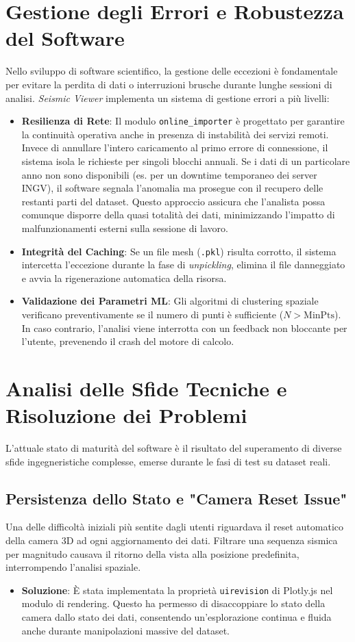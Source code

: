 \documentclass[12pt,a4paper]{article}
\begin{document}
\section{Gestione degli Errori e Robustezza del Software}
Nello sviluppo di software scientifico, la gestione delle eccezioni è fondamentale per evitare la perdita di dati o interruzioni brusche durante lunghe sessioni di analisi. \textit{Seismic Viewer} implementa un sistema di gestione errori a più livelli:
\begin{itemize}
    \item \textbf{Resilienza di Rete}: Il modulo \texttt{online\_importer} è progettato per garantire la continuità operativa anche in presenza di instabilità dei servizi remoti. Invece di annullare l'intero caricamento al primo errore di connessione, il sistema isola le richieste per singoli blocchi annuali. Se i dati di un particolare anno non sono disponibili (es. per un downtime temporaneo dei server INGV), il software segnala l'anomalia ma prosegue con il recupero delle restanti parti del dataset. Questo approccio assicura che l'analista possa comunque disporre della quasi totalità dei dati, minimizzando l'impatto di malfunzionamenti esterni sulla sessione di lavoro.
    \item \textbf{Integrità del Caching}: Se un file mesh (\texttt{.pkl}) risulta corrotto, il sistema intercetta l'eccezione durante la fase di \textit{unpickling}, elimina il file danneggiato e avvia la rigenerazione automatica della risorsa.
    \item \textbf{Validazione dei Parametri ML}: Gli algoritmi di clustering spaziale verificano preventivamente se il numero di punti è sufficiente ($N > \text{MinPts}$). In caso contrario, l'analisi viene interrotta con un feedback non bloccante per l'utente, prevenendo il crash del motore di calcolo.
\end{itemize}

\section{Analisi delle Sfide Tecniche e Risoluzione dei Problemi}
L'attuale stato di maturità del software è il risultato del superamento di diverse sfide ingegneristiche complesse, emerse durante le fasi di test su dataset reali.

\subsection{Persistenza dello Stato e "Camera Reset Issue"}
Una delle difficoltà iniziali più sentite dagli utenti riguardava il reset automatico della camera 3D ad ogni aggiornamento dei dati. Filtrare una sequenza sismica per magnitudo causava il ritorno della vista alla posizione predefinita, interrompendo l'analisi spaziale.
\begin{itemize}
    \item \textbf{Soluzione}: È stata implementata la proprietà \texttt{uirevision} di Plotly.js nel modulo di rendering. Questo ha permesso di disaccoppiare lo stato della camera dallo stato dei dati, consentendo un'esplorazione continua e fluida anche durante manipolazioni massive del dataset.
\end{itemize}
\end{document}
